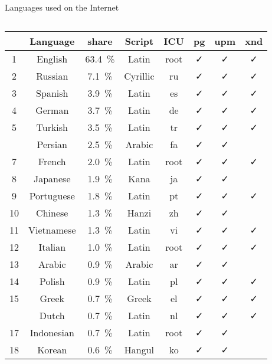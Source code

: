 \documentclass[aspectratio=169,10pt]{beamer}
\newcommand{\colRd}{\color{purple}}
\newcommand{\colGn}{\color{teal}}
\begin{document}

\begin{frame}{Languages used on the Internet}

\setlength\dashlinedash{0.5pt}
\setlength\dashlinegap{1.0pt}

\begin{columns}
\begin{column}{69mm}
\begin{center}
\scriptsize
\begin{tabular}{cc@{~}c@{~}c|c@{~~}c@{~~}c@{~~}c}
  & Language & share & Script & ICU & pg & upm & xnd\\\hline\hline
1 & English & 63.4~\%     &   Latin &  root    & ✓ & ✓ & ✓  \\
2 & Russian & 7.1~\%      &   Cyrillic & ru    & ✓ & ✓ & ✓  \\
3 & Spanish & 3.9~\%      &   Latin &    es    & ✓ & ✓ & ✓  \\
4 & German & 3.7~\%       &   Latin &    de    & ✓ & ✓ & ✓  \\
5 & Turkish & 3.5~\%      &   Latin &    tr    & ✓ & ✓ & ✓  \\\hdashline
6 & Persian & 2.5~\%      &   {\colGn Arabic } &   fa    & ✓ & ✓ &     \\
7 & French & 2.0~\%       &   Latin &    root  & ✓ & ✓ & ✓  \\
8 & Japanese & 1.9~\%     &   {\colRd Kana   } &   ja    & ✓ & ✓ &     \\
9 & Portuguese & 1.8~\%   &   Latin &    pt    & ✓ & ✓ & ✓  \\
10 & Chinese & 1.3~\%     &   {\colRd Hanzi  } &   zh    & ✓ & ✓ &     \\\hline
11 & Vietnamese & 1.3~\%  &   Latin &    vi    & ✓ & ✓ & ✓  \\
12 & Italian & 1.0~\%     &   Latin &    root  & ✓ & ✓ & ✓  \\
13 & Arabic & 0.9~\%      &   {\colGn Arabic } &   ar    & ✓ & ✓ &     \\
14 & Polish & 0.9~\%      &   Latin &    pl    & ✓ & ✓ & ✓  \\
15 & Greek & 0.7~\%       &   Greek &    el    & ✓ & ✓ & ✓  \\\hdashline
16 & Dutch & 0.7~\%       &   Latin &    nl    & ✓ & ✓ & ✓  \\
17 & Indonesian & 0.7~\%  &   Latin &    root  & ✓ & ✓ &     \\%
18 & Korean & 0.6~\%      &   {\colRd Hangul } &   ko    & ✓ & ✓ &     \\

\end{tabular}
\end{center}
\end{column}
\end{columns}
\end{frame}
\end{document}
